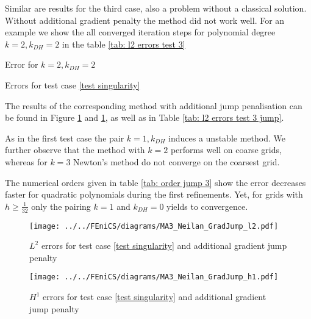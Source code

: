 Similar are results for the third case, also a problem without a classical solution. Without additional gradient penalty the method did not work well. For an example we show the all converged iteration steps for polynomial degree $k=2, k_{DH}=2$ in the table \ref{tab: l2 errors test 3}
\begin{table}[H]
		\centering
		\pgfplotstabletypeset[
		columns={iterations, l2error, h1error,N},
		    every row 0 column 0/.style={set content=init},
		]{\MAThreedegTwoTwo}
    	\caption{Error for $k=2, k_{DH}=2$}
	\caption{Errors for test case \ref{test singularity}}
	\label{tab: l2 errors test 3}
\end{table}

The results of the corresponding method with additional jump penalisation can be found in Figure \ref{fig: l2 errors test 3 jump} and \ref{fig: l2 errors test 3 jump}, as well as in Table \ref{tab: l2 errors test 3 jump}. 

As in the first test case the pair $k=1, k_{DH}$ induces a unstable method. We further observe that the method with $k=2$ performs well on coarse grids, whereas for $k=3$ Newton's method do not converge on the coarsest grid. 

The numerical orders given in table \ref{tab: order jump 3} show the error decreases faster for quadratic polynomials during the first refinements. Yet, for grids with $h \geq \frac 1 {32}$ only the pairing $k=1$ and $k_{DH} =0$ yields to convergence.

\begin{figure}[H]
	\centering
	\texttt{[image: ../../FEniCS/diagrams/MA3\_Neilan\_GradJump\_l2.pdf]}
	\caption{$L^2$ errors for test case \ref{test singularity} and additional gradient jump penalty}
	\label{fig: l2 errors test 3 jump}
\end{figure}

\begin{figure}[H]
	\centering
	\texttt{[image: ../../FEniCS/diagrams/MA3\_Neilan\_GradJump\_h1.pdf]}
	\caption{$H^1$ errors for test case \ref{test singularity} and additional gradient jump penalty}
	\label{fig: h1 errors test 3 jump}
\end{figure}

